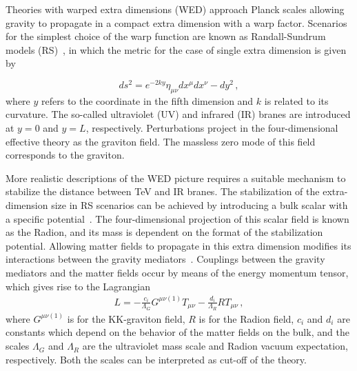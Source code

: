 Theories with warped extra dimensions (WED) approach Planck scales allowing gravity 
to propagate in a compact extra dimension with a warp factor.
Scenarios for the simplest choice of the warp function are known as Randall-Sundrum models
(RS)~\cite{Randall:1999ee}, in which the metric for the case of single extra dimension is given by

\begin{equation}
ds^2 =  e^{- 2 k y}  \eta_{\mu\nu} dx^\mu dx^\nu - dy^2 \,,
\label{expky}
\end{equation}
where $y$ refers to the coordinate in the fifth dimension and $k$ is related to its curvature.
The so-called ultraviolet (UV) and infrared (IR) branes are introduced at $y=0$ and $y=L$,
respectively.
Perturbations project in the four-dimensional effective theory
as the graviton field. The massless zero mode of this field corresponds to the graviton.

More realistic descriptions of the WED picture requires a suitable mechanism to stabilize the
distance between TeV and IR branes.
The stabilization of the extra-dimension size in RS scenarios can be achieved by introducing a bulk scalar
with a specific potential~\cite{Goldberger:1999uk}.
The four-dimensional projection of this scalar field is known as the Radion, 
and its mass is dependent on the format of the stabilization potential. %
Allowing matter fields to propagate in this extra dimension modifies its interactions between the gravity mediators~\cite{Gherghetta:2010cj}. 
Couplings between the gravity mediators and the matter fields occur by means of the
energy momentum tensor, which gives rise to the Lagrangian~\cite{Giudice:1998ck,Csaki:2000zn}
\begin{eqnarray}
L = - \frac{c_i}{\Lambda_G}  G^{\mu\nu(1)} T_{\mu\nu}
- \frac{d_i}{\Lambda_{R}}  R T_{\mu\nu} \,,
\label{eq:wed_lagrangian}
\end{eqnarray}
where $G^{\mu\nu(1)}$ is for the KK-graviton field, $R$ is for the Radion field,
$c_i$ and $d_i$ are constants which depend on the behavior of the matter fields on the bulk, and
the scales $\Lambda_G$ and $\Lambda_R$ are the ultraviolet mass scale and Radion vacuum expectation,
respectively. Both the scales can be interpreted as cut-off of the theory.

